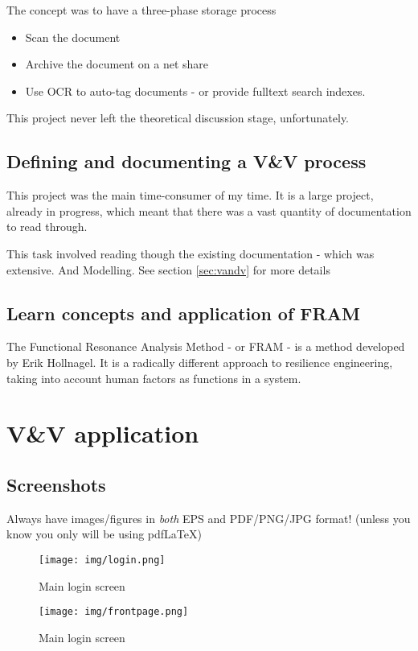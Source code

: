 \documentclass[11pt,a4paper,UKenglish]{article}
\begin{document}
The concept was to have a three-phase storage process
\begin{itemize}
  \item Scan the document
  \item Archive the document on a net share
  \item Use OCR to auto-tag documents - or provide fulltext search indexes.
\end{itemize}
This project never left the theoretical discussion stage, unfortunately.

\subsection{Defining and documenting a V\&V process}
This project was the main time-consumer of my time. It is a large project, already in progress, which meant that there was a vast quantity of documentation to read through.

This task involved reading though the existing documentation - which was extensive. And Modelling. See section \ref{sec:vandv} for more details


\subsection{Learn concepts and application of FRAM}
The Functional Resonance Analysis Method - or FRAM - is a method developed by Erik Hollnagel. It is a radically different approach to resilience engineering, taking into account human factors as functions in a system.


\section{V\&V application}
\subsection{Screenshots}
Always have images/figures in \emph{both} EPS and PDF/PNG/JPG format! (unless you know you only will be using pdfLaTeX)


\begin{figure}[!tbh]
	\centering
	\texttt{[image: img/login.png]}
	\caption{Main login screen}
	\label{fig:login}
\end{figure}

\begin{figure}[!tbh]
	\centering
	\texttt{[image: img/frontpage.png]}
	\caption{Main login screen}
	\label{fig:login}
\end{figure}
\end{document}
